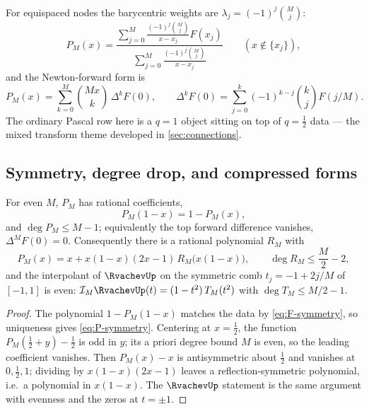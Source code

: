 \documentclass[11pt,oneside]{article}
\numberwithin{equation}{section}
\theoremstyle{definition}
\theoremstyle{remark}
\newcommand{\Lag}{\mathcal I}
\begin{document}
For equispaced nodes the barycentric weights are
$\lambda_j=(-1)^{j}\binom Mj$:
\begin{equation}
 P_M(x)=
 \frac{\displaystyle\sum_{j=0}^{M}
 \frac{(-1)^{j}\binom Mj}{x-x_j}F(x_j)}
 {\displaystyle\sum_{j=0}^{M}
 \frac{(-1)^{j}\binom Mj}{x-x_j}}
 \qquad(x\notin\{x_j\}),
 \label{eq:bary-full}
\end{equation}
and the Newton-forward form is
\begin{equation}
 P_M(x)=\sum_{k=0}^{M}\binom{Mx}{k}\,\Delta^{k}F(0),
 \qquad
 \Delta^{k}F(0)=\sum_{j=0}^{k}(-1)^{k-j}\binom kjF(j/M).
 \label{eq:newton-forward}
\end{equation}
The ordinary Pascal row here is a $q=1$ object sitting on top of
$q=\tfrac12$ data --- the mixed transform theme developed in
\cref{sec:connections}.

\subsection{Symmetry, degree drop, and compressed forms}

\begin{proposition}
\label{prop:symmetry}
For even $M$, $P_M$ has rational coefficients,
\begin{equation}
 P_M(1-x)=1-P_M(x),
 \label{eq:P-symmetry}
\end{equation}
and $\deg P_M\le M-1$; equivalently the top forward difference
vanishes, $\Delta^{M}F(0)=0$.  Consequently there is a rational
polynomial $R_M$ with
\begin{equation}
 P_M(x)=x+x(1-x)(2x-1)\,R_M\bigl(x(1-x)\bigr),
 \qquad
 \deg R_M\le\frac M2-2,
 \label{eq:F-compressed}
\end{equation}
and the interpolant of $\RvachevUp$ on the symmetric comb
$t_j=-1+2j/M$ of $[-1,1]$ is even:
$\Lag_M\RvachevUp(t)=(1-t^{2})\,T_M(t^{2})$ with $\deg T_M\le M/2-1$.
\end{proposition}

\begin{proof}
The polynomial $1-P_M(1-x)$ matches the data by
\eqref{eq:F-symmetry}, so uniqueness gives \eqref{eq:P-symmetry}.
Centering at $x=\tfrac12$, the function $P_M(\tfrac12+y)-\tfrac12$ is
odd in $y$; its a priori degree bound $M$ is even, so the leading
coefficient vanishes.  Then $P_M(x)-x$ is antisymmetric about
$\tfrac12$ and vanishes at $0,\tfrac12,1$; dividing by
$x(1-x)(2x-1)$ leaves a reflection-symmetric polynomial, i.e.\ a
polynomial in $x(1-x)$.  The $\RvachevUp$ statement is the same argument
with evenness and the zeros at $t=\pm1$.
\end{proof}
\end{document}
